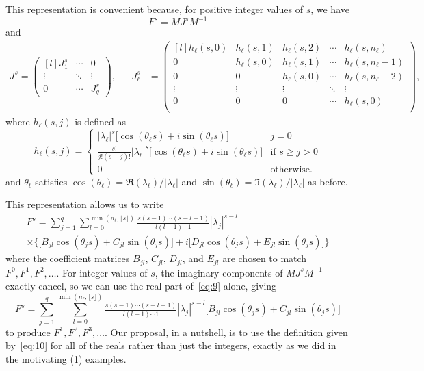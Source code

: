 \documentclass[12pt,fleqn]{article}
\begin{document}
This representation is convenient because, for positive integer values
of $s$, we have
\[
F^s = M J^s M^{-1}
\]
and
\begin{align*}
J^s =
\begin{pmatrix*}[l]
  J_1^s  & \cdots & 0      \\
  \vdots & \ddots & \vdots \\
  0      & \cdots & J_q^s
\end{pmatrix*}, &&
J_\ell^s &=
\begin{pmatrix*}[l]
  h_\ell(s,0) & h_\ell(s,1) & h_\ell(s,2) & \cdots & h_\ell(s,n_\ell)   \\
  0           & h_\ell(s,0) & h_\ell(s,1) & \cdots & h_\ell(s,n_\ell-1) \\
  0           & 0           & h_\ell(s,0) & \cdots & h_\ell(s,n_\ell-2) \\
  \vdots      & \vdots      & \vdots      & \ddots & \vdots             \\
  0           & 0           & 0           & \cdots & h_\ell(s,0)        \\
\end{pmatrix*},
\end{align*}
  where $h_\ell(s,j)$ is defined as
\begin{equation*}
h_\ell(s,j) =
\begin{cases}
  |\lambda_\ell|^s \big[\cos(\theta_\ell s) + i \sin(\theta_\ell s)\big] & j = 0 \\
  \frac{s!}{j!(s-j)!} |\lambda_\ell|^s \big[\cos(\theta_\ell s) + i \sin(\theta_\ell s)\big] & \text{if } s \geq j > 0 \\
  0 & \text{otherwise.}
\end{cases}
\end{equation*}
and $\theta_\ell$ satisfies
$\cos(\theta_\ell) = \Re(\lambda_\ell)/|\lambda_\ell|$ and
$\sin(\theta_\ell) = \Im(\lambda_\ell)/|\lambda_\ell|$ as before.

This representation allows us to write
\begin{multline}
  \label{eq:9}
  F^s =
  \sum_{j = 1}^q \sum_{l=0}^{\min(n_\ell, \lfloor s\rfloor)} \tfrac{s(s-1)\cdots(s-l+1)}{l (l - 1) \cdots 1} |\lambda_j|^{s-l} \\
  \times\Big\{\big[B_{jl} \cos(\theta_j s) + C_{jl} \sin(\theta_j s)\big] + i\big[D_{jl} \cos(\theta_j s) + E_{jl} \sin(\theta_j s)\big]\Big\}
\end{multline}
where the coefficient matrices $B_{jl}$, $C_{jl}$, $D_{jl}$, and
$E_{jl}$ are chosen to match $F^0, F^1, F^2,\dots$. For integer
values of $s$, the imaginary components of $M J^s M^{-1}$ exactly
cancel, so we can use the real part of~\eqref{eq:9} alone, giving
\begin{equation}
  \label{eq:10}
  F^s =
  \sum_{j = 1}^q \sum_{l=0}^{\min(n_\ell, \lfloor s \rfloor)} \tfrac{s(s-1)\cdots(s-l+1)}{l (l - 1) \cdots 1} |\lambda_j|^{s-l} \big[B_{jl} \cos(\theta_j s) + C_{jl} \sin(\theta_j s)\big]
\end{equation}
to produce $F^1, F^2, F^3,\dots$. Our proposal, in a nutshell, is to
use the definition given by~\eqref{eq:10} for all of the reals rather
than just the integers, exactly as we did in the motivating \AR(1)
examples.
\end{document}
